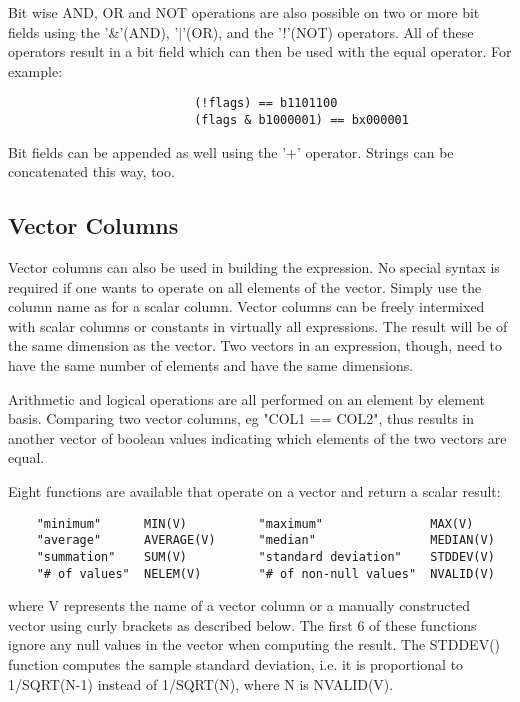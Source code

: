 \documentclass[11pt]{book}
\begin{document}
    Bit wise AND, OR and NOT operations are  also  possible  on  two  or
    more  bit  fields  using  the  '\&'(AND),  '$|$'(OR),  and the '!'(NOT)
    operators. All of these operators result in a bit  field  which  can
    then be used with the equal operator. For example:


\begin{verbatim}
                          (!flags) == b1101100
                          (flags & b1000001) == bx000001
\end{verbatim}

    Bit  fields can be appended as well using the '+' operator.  Strings
    can be concatenated this way, too.


\subsection{Vector Columns}

    Vector columns can also be used  in  building  the  expression.   No
    special  syntax  is required if one wants to operate on all elements
    of the vector.  Simply use the column name as for a  scalar  column.
    Vector  columns  can  be  freely  intermixed  with scalar columns or
    constants in virtually all expressions.  The result will be  of  the
    same dimension as the vector.  Two vectors in an expression, though,
    need to  have  the  same  number  of  elements  and  have  the  same
    dimensions.

    Arithmetic and logical operations are all performed on an element by
    element basis.  Comparing two vector columns,  eg  "COL1  ==  COL2",
    thus  results  in  another vector of boolean values indicating which
    elements of the two vectors are equal.

    Eight functions are available that operate on a vector and return a
    scalar result:

\begin{verbatim}
    "minimum"      MIN(V)          "maximum"               MAX(V)
    "average"      AVERAGE(V)      "median"                MEDIAN(V)
    "summation"    SUM(V)          "standard deviation"    STDDEV(V)
    "# of values"  NELEM(V)        "# of non-null values"  NVALID(V)
\end{verbatim}
    where V represents the name of a vector column or a manually
    constructed vector using curly brackets as described below.  The
    first 6 of these functions ignore any null values in the vector when
    computing the result.  The STDDEV() function computes the sample
    standard deviation, i.e. it is proportional to 1/SQRT(N-1) instead
    of 1/SQRT(N), where N is NVALID(V).
\end{document}
